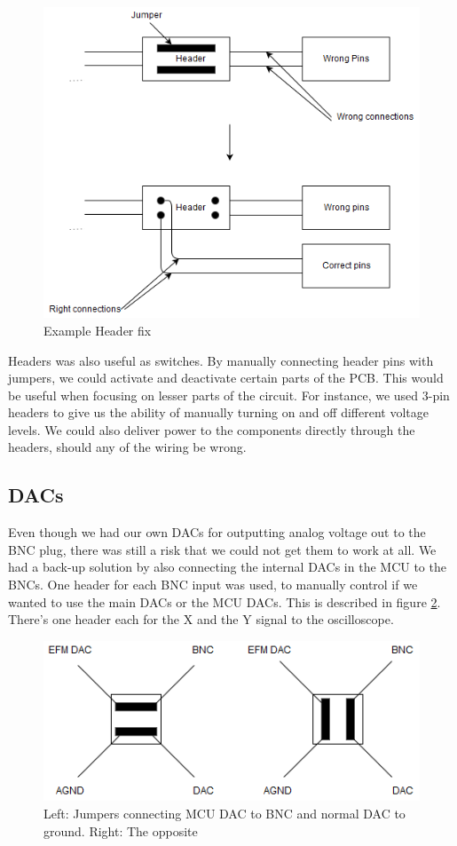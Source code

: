 \begin{itemize}
\begin{figure}[h!]
\centering
\includegraphics[scale = 0.45]{images/Header_fix.png}
\caption{Example Header fix}
\label{fig:Header fix}
\end{figure}

Headers was also useful as switches. By manually connecting header pins with jumpers, we could activate and deactivate certain parts of the PCB. This would be useful when focusing on lesser parts of the circuit. For instance, we used 3-pin headers to give us the ability of manually turning on and off different voltage levels. We could also deliver power to the components directly through the headers, should any of the wiring be wrong.

\subsection{DACs}
Even though we had our own DACs for outputting analog voltage out to the BNC plug, there was still a risk that we could not get them to work at all. We had a back-up solution by also connecting the internal DACs in the MCU to the BNCs. One header for each BNC input was used, to manually control if we wanted to use the main DACs or the MCU DACs. This is described in figure \ref{fig:DAC headers}. There's one header each for the X and the Y signal to the oscilloscope. 

\begin{figure}[h!]
\centering
\includegraphics[scale = 0.6]{images/DAC_headers.png}
\caption{Left: Jumpers connecting MCU DAC to BNC and normal DAC to ground.
         Right: The opposite}
\label{fig:DAC headers}
\end{figure}


\end{itemize}

